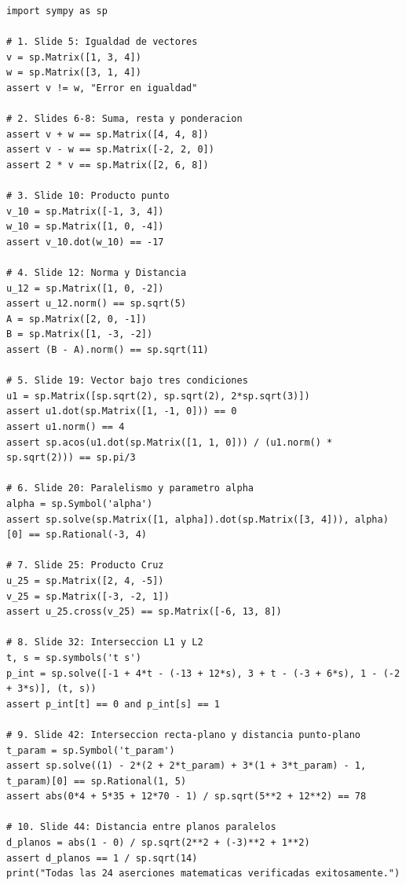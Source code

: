 \documentclass[10pt,letterpaper]{article}
\begin{document}
\begin{lstlisting}[caption={Suite de Verificación Simbólica de los 24 Problemas de Cátedra}]
import sympy as sp

# 1. Slide 5: Igualdad de vectores
v = sp.Matrix([1, 3, 4])
w = sp.Matrix([3, 1, 4])
assert v != w, "Error en igualdad"

# 2. Slides 6-8: Suma, resta y ponderacion
assert v + w == sp.Matrix([4, 4, 8])
assert v - w == sp.Matrix([-2, 2, 0])
assert 2 * v == sp.Matrix([2, 6, 8])

# 3. Slide 10: Producto punto
v_10 = sp.Matrix([-1, 3, 4])
w_10 = sp.Matrix([1, 0, -4])
assert v_10.dot(w_10) == -17

# 4. Slide 12: Norma y Distancia
u_12 = sp.Matrix([1, 0, -2])
assert u_12.norm() == sp.sqrt(5)
A = sp.Matrix([2, 0, -1])
B = sp.Matrix([1, -3, -2])
assert (B - A).norm() == sp.sqrt(11)

# 5. Slide 19: Vector bajo tres condiciones
u1 = sp.Matrix([sp.sqrt(2), sp.sqrt(2), 2*sp.sqrt(3)])
assert u1.dot(sp.Matrix([1, -1, 0])) == 0
assert u1.norm() == 4
assert sp.acos(u1.dot(sp.Matrix([1, 1, 0])) / (u1.norm() * sp.sqrt(2))) == sp.pi/3

# 6. Slide 20: Paralelismo y parametro alpha
alpha = sp.Symbol('alpha')
assert sp.solve(sp.Matrix([1, alpha]).dot(sp.Matrix([3, 4])), alpha)[0] == sp.Rational(-3, 4)

# 7. Slide 25: Producto Cruz
u_25 = sp.Matrix([2, 4, -5])
v_25 = sp.Matrix([-3, -2, 1])
assert u_25.cross(v_25) == sp.Matrix([-6, 13, 8])

# 8. Slide 32: Interseccion L1 y L2
t, s = sp.symbols('t s')
p_int = sp.solve([-1 + 4*t - (-13 + 12*s), 3 + t - (-3 + 6*s), 1 - (-2 + 3*s)], (t, s))
assert p_int[t] == 0 and p_int[s] == 1

# 9. Slide 42: Interseccion recta-plano y distancia punto-plano
t_param = sp.Symbol('t_param')
assert sp.solve((1) - 2*(2 + 2*t_param) + 3*(1 + 3*t_param) - 1, t_param)[0] == sp.Rational(1, 5)
assert abs(0*4 + 5*35 + 12*70 - 1) / sp.sqrt(5**2 + 12**2) == 78

# 10. Slide 44: Distancia entre planos paralelos
d_planos = abs(1 - 0) / sp.sqrt(2**2 + (-3)**2 + 1**2)
assert d_planos == 1 / sp.sqrt(14)
print("Todas las 24 aserciones matematicas verificadas exitosamente.")
\end{lstlisting}

\end{document}
